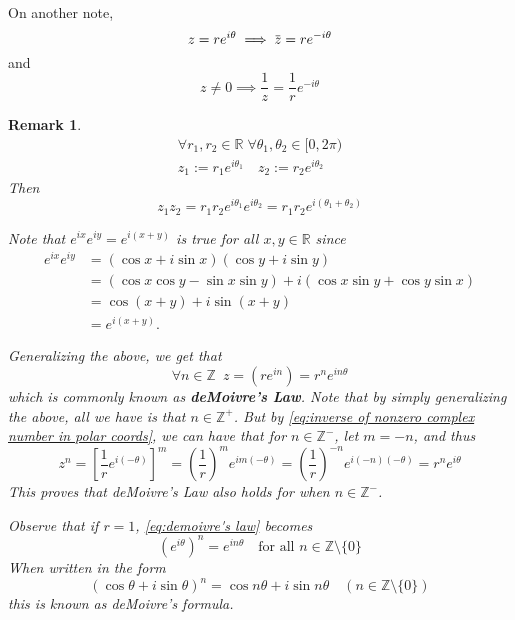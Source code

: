 \documentclass[11pt, oneside]{book}
\theoremstyle{break}
\newtheorem*{remark}{Remark}
\renewcommand{\bar}[1]{\mkern 1.5mu \overline{\mkern -1.5mu #1 \mkern -1.5mu} \mkern 1.5mu}
\begin{document}
On another note,
\begin{equation*}
	z = re^{i \theta} \implies \bar{z} = re^{-i \theta}
\end{equation*}
and
\begin{equation}\label{eq:inverse of nonzero complex number in polar coords}
	z \neq 0 \implies \frac{1}{z} = \frac{1}{r} e^{-i \theta}
\end{equation}

\begin{remark}
	\begin{gather*}
		\forall r_1, r_2 \in \mathbb{R} \; \forall \theta_1, \theta_2 \in [0, 2\pi) \\
		z_1 := r_1 e^{i \theta_1} \quad z_2 := r_2 e^{i \theta_2}
	\end{gather*}
	Then
	\begin{equation*}
		z_1 z_2 = r_1 r_2 e^{i \theta_1} e^{i \theta_2} = r_1 r_2 e^{i (\theta_1 + \theta_2)}
	\end{equation*}

	Note that $e^{ix} e^{iy} = e^{i(x + y)}$ is true for all $x, y \in \mathbb{R} $ since
	\begin{align*}
		e^{ix} e^{iy}
			&= (\cos x + i \sin x)(\cos y + i \sin y) \\
			&= (\cos x \cos y - \sin x \sin y) + i (\cos x \sin y + \cos y \sin x) \\
			&= \cos (x + y) + i \sin (x + y) \\
			&= e^{i (x + y)}.
	\end{align*}

	Generalizing the above, we get that
	\begin{equation}\label{eq:demoivre's law}
		\forall n \in \mathbb{Z} \enspace z = (re^{in}) = r^n e^{in\theta}
	\end{equation}
	which is commonly known as \textbf{deMoivre's Law}. Note that by simply generalizing the above, all we have is that $n \in \mathbb{Z^+}$. But by \cref{eq:inverse of nonzero complex number in polar coords}, we can have that for $n \in \mathbb{Z^-}$, let $m = -n$, and thus
	\begin{equation*}
		z^n = \left[ \frac{1}{r} e^{i (-\theta)} \right]^m = \left(\frac{1}{r}\right)^m e^{im (-\theta)} = \left(\frac{1}{r} \right)^{-n} e^{i (-n) (-\theta)} = r^n e^{i\theta}
	\end{equation*}
	This proves that deMoivre's Law also holds for when $n \in \mathbb{Z^-}$.

	Observe that if $r = 1$, \cref{eq:demoivre's law} becomes
	\begin{equation}
		(e^{i\theta})^n = e^{in\theta} \quad \text{for all } n \in \mathbb{Z} \setminus \{0\} 
	\end{equation}
	When written in the form
	\begin{equation}\label{eq:demoivre's formula}
		(\cos \theta + i \sin \theta)^n = \cos n\theta + i \sin n\theta \quad (n \in \mathbb{Z} \setminus \{0\})
	\end{equation}
	this is known as \textit{deMoivre's formula}.
\end{remark}
\end{document}
